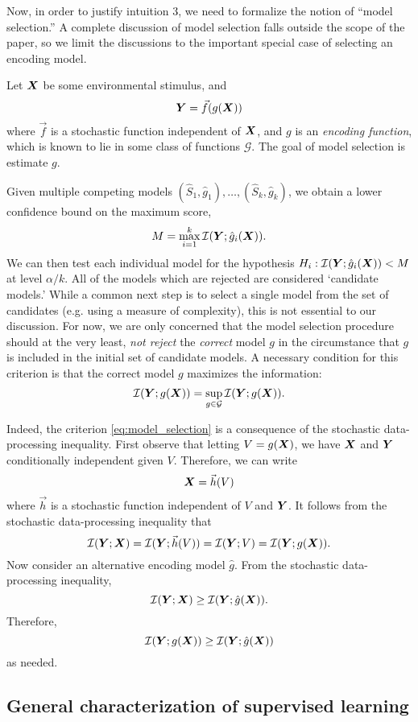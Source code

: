 \documentclass[12pt]{article}
\begin{document}
Now, in order to justify intuition 3, we need to formalize the notion
of ``model selection.''  A complete discussion of model selection
falls outside the scope of the paper, so we limit the discussions
to the important special case of selecting an encoding model.

Let $\boldsymbol{X}$ be some environmental stimulus, and
\[
\boldsymbol{Y} = \vec{f}(g(\boldsymbol{X}))
\]
where $\vec{f}$ is a stochastic function independent of $\boldsymbol{X}$, and $g$ is
an \emph{encoding function}, which is known to lie in some class of
functions $\mathcal{G}$.  The goal of model selection is estimate $g$.

Given multiple competing models $(\hat{S}_1, \hat{g}_1),\hdots,
(\hat{S}_k, \hat{g}_k)$, we obtain a lower confidence bound on the maximum score,
\[
M = \max_{i=1}^k \mathcal{I}(\boldsymbol{Y}; \hat{g}_i(\boldsymbol{X})).
\]
We can then test each individual model for the hypothesis
$H_i: \mathcal{I}(\boldsymbol{Y}; \hat{g}_i(\boldsymbol{X})) < M$ at level $\alpha/k$.  All of the models which
are rejected are considered `candidate models.'  While a common next
step is to select a single model from the set of candidates
(e.g. using a measure of complexity), this is not essential to our
discussion.  For now, we are only concerned that the model selection
procedure should at the very least, \emph{not reject}
the \emph{correct} model $g$ in the circumstance that $g$ is included
in the initial set of candidate models.  A necessary condition for
this criterion is that the correct model $g$ maximizes the
information:
\begin{equation}\label{eq:model_selection}
\mathcal{I}(\boldsymbol{Y}; g(\boldsymbol{X})) = \sup_{g \in \mathcal{G}} \mathcal{I}(\boldsymbol{Y}; g(\boldsymbol{X})).
\end{equation}

Indeed, the criterion \eqref{eq:model_selection} is a consequence of
the stochastic data-processing inequality.  First observe that letting
$V = g(\boldsymbol{X})$, we have $\boldsymbol{X}$ and $\boldsymbol{Y}$ conditionally independent given
$V$.  Therefore, we can write
\[
\boldsymbol{X} = \vec{h}(V)
\]
where $\vec{h}$ is a stochastic function independent of $V$ and $\boldsymbol{Y}$.
It follows from the stochastic data-processing inequality that
\[
\mathcal{I}(\boldsymbol{Y}; \boldsymbol{X}) = \mathcal{I}(\boldsymbol{Y}; \vec{h}(V)) = \mathcal{I}(\boldsymbol{Y}; V) = \mathcal{I}(\boldsymbol{Y}; g(\boldsymbol{X})).
\]
Now consider an alternative encoding model $\hat{g}$.  From the stochastic data-processing inequality,
\[
\mathcal{I}(\boldsymbol{Y}; \boldsymbol{X}) \geq \mathcal{I}(\boldsymbol{Y}; \hat{g}(\boldsymbol{X})).
\]
Therefore,
\[
\mathcal{I}(\boldsymbol{Y}; g(\boldsymbol{X})) \geq \mathcal{I}(\boldsymbol{Y}; \hat{g}(\boldsymbol{X}))
\]
as needed.

\subsection{General characterization of supervised learning}
\end{document}
